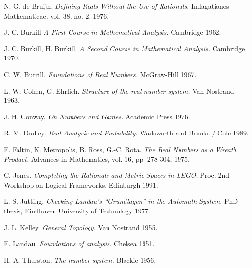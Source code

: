 \begin{thebibliography}{99}

 N. G. de Bruijn. {\em Defining Reals Without the Use of
Rationals.} Indagationes Mathematicae, vol. 38, no. 2, 1976.

 J. C. Burkill {\em A First Course in Mathematical Analysis.}
Cambridge 1962.

 J. C. Burkill, H. Burkill. {\em A Second Course in
Mathematical Analysis.} Cambridge 1970.

 C. W. Burrill. {\em Foundations of Real Numbers.} McGraw-Hill
1967.

 L. W. Cohen, G. Ehrlich. {\em Structure of the real number
system.} Van Nostrand 1963.

 J. H. Conway. {\em On Numbers and Games.} Academic Press 1976.

 R. M. Dudley. {\em Real Analysis and Probability.} Wadsworth
and Brooks / Cole 1989.

 F. Faltin, N. Metropolis, B. Ross, G.-C. Rota. {\em The Real
Numbers as a Wreath Product.} Advances in Mathematics, vol. 16, pp. 278-304,
1975.

 C. Jones. {\em Completing the Rationals and Metric Spaces in
LEGO.} Proc. 2nd Workshop on Logical Frameworks, Edinburgh 1991.

 L. S. Jutting. {\em Checking Landau's ``Grundlagen'' in the
Automath System.} PhD thesis, Eindhoven University of Technology 1977.

 J. L. Kelley. {\em General Topology.} Van Nostrand 1955.

 E. Landau. {\em Foundations of analysis.} Chelsea 1951.

 H. A. Thurston. {\em The number system.} Blackie 1956.

\end{thebibliography}
